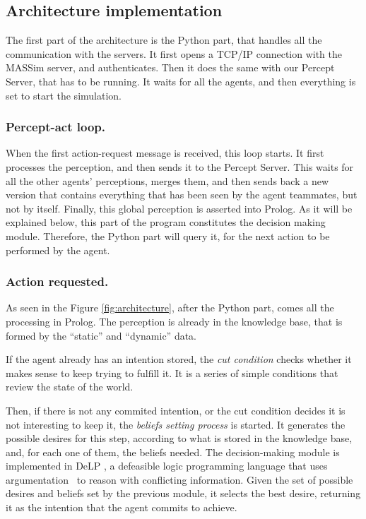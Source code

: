\documentclass{llncs2e/llncs}
\begin{document}
\subsection{Architecture implementation}

    The first part of the architecture is the Python part, that handles all the 
    communication with the servers. It first opens a TCP/IP connection with the 
    MASSim server, and authenticates. Then it does the same with our Percept 
    Server, that has to be running. It waits for all the agents, and then 
    everything is set to start the simulation.

\subsubsection{Percept-act loop.}

    When the first action-request message is received, this loop starts. It 
    first processes the perception, and then sends it to the Percept Server. 
    This waits for all the other agents' perceptions, merges them, and then sends 
    back a new version that contains everything that has been seen by the agent 
    teammates, but not by itself. Finally, this global perception is asserted 
    into Prolog. 
    As it will be explained below, this part of the program constitutes the 
    decision making module. Therefore, the Python part will query it, for the
    next action to be performed by the agent.

\subsubsection{Action requested.}

    As seen in the Figure \ref{fig:architecture}, after the Python part, comes 
    all the processing in Prolog. The perception is already in the knowledge 
    base, that is formed by the ``static'' and ``dynamic'' data. 

    If the agent already has an intention stored, the \textit{cut condition}
    checks whether it makes sense to keep trying to fulfill it. It is a series
    of simple conditions that review the state of the world.

    Then, if there is not any commited intention, or the cut condition decides 
    it is not interesting to keep it, the \textit{beliefs setting process} is 
    started. It generates the possible desires for this step, according to what 
    is stored in the knowledge base, and, for each one of them, the beliefs 
    needed. 
    The decision-making module is implemented in DeLP\cite{Rotstein:2007}
    \cite{Ferretti:2008},
    a defeasible logic 
    programming language that uses argumentation 
    \cite{DBLP:conf/comma/2008}\ to reason with conflicting
    information. 
    Given the set of possible 
    desires and beliefs set by the previous module, it selects the best desire, 
    returning it as the intention that the agent commits to achieve.
\end{document}
